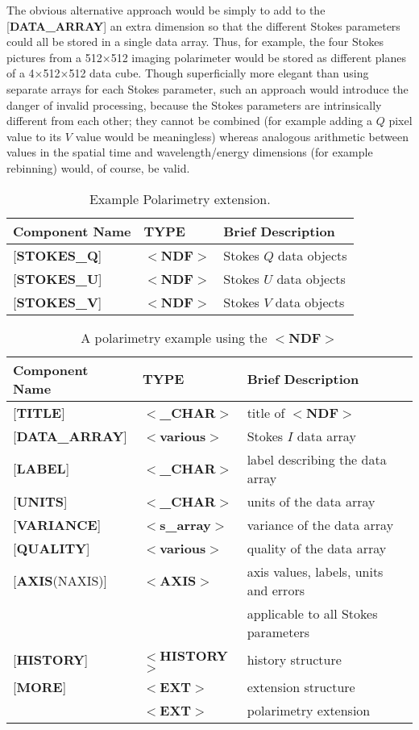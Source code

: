 \documentclass[twoside,11pt]{article}
\begin{document}
The obvious alternative approach would be simply to
add to the {[}{\bf DATA\_ARRAY}{]} an extra dimension so that
the different Stokes parameters could all be stored in a
single data array.  Thus, for example, the four Stokes pictures from a
512$\times$512 imaging polarimeter would be stored as different planes of a
4$\times$512$\times$512 data cube.
Though superficially more elegant than using
separate arrays for each Stokes parameter, such
an approach would introduce the danger
of invalid processing, because the Stokes
parameters are intrinsically different from each other; they cannot
be combined (for example adding a $Q$ pixel
value to its $V$ value would be meaningless)
whereas analogous arithmetic between values in the spatial
time and wavelength/energy dimensions (for example rebinning)
would, of course, be valid.

\begin{table}[htb]
\centering
\caption{Example Polarimetry extension.}
\begin{tabular}{|l|l|l|}
\hline
Component Name & TYPE & Brief Description \\ \hline
{[}{\bf STOKES\_Q}{]} & $<${\bf NDF}$>$ & Stokes $Q$ data objects \\
{[}{\bf STOKES\_U}{]} & $<${\bf NDF}$>$ & Stokes $U$ data objects \\
{[}{\bf STOKES\_V}{]} & $<${\bf NDF}$>$ & Stokes $V$ data objects \\ \hline
\end{tabular}
\end{table}

\begin{table}[htb]
\centering
\caption{A polarimetry example using the $<${\bf NDF}$>$}
\begin{tabular}{|l|l|l|}
\hline
Component Name & TYPE & Brief Description \\ \hline
{[}{\bf TITLE}{]} & $<${\bf \_CHAR}$>$ & title of $<${\bf NDF}$>$ \\
{[}{\bf DATA\_ARRAY}{]} & $<${\bf various}$>$ & Stokes $I$ data array \\
{[}{\bf LABEL}{]} & $<${\bf \_CHAR}$>$ & label describing the data array \\
{[}{\bf UNITS}{]} & $<${\bf \_CHAR}$>$ & units of the data array \\
{[}{\bf VARIANCE}{]} & $<${\bf s\_array}$>$ & variance of the data array \\
{[}{\bf QUALITY}{]} & $<${\bf various}$>$ & quality of the data array \\
{[}{\bf AXIS}(NAXIS){]} & $<${\bf AXIS}$>$ & axis values, labels, units and errors\\
& & applicable to all Stokes parameters \\
{[}{\bf HISTORY}{]} & $<${\bf HISTORY}$>$ & history structure \\
{[}{\bf MORE}{]} & $<${\bf EXT}$>$ & extension structure \\
\hspace{14mm}{[}{\bf .POLARIMETRY}{]} & $<${\bf EXT}$>$ & polarimetry extension \\ \hline
\end{tabular}
\end{table}
\end{document}

